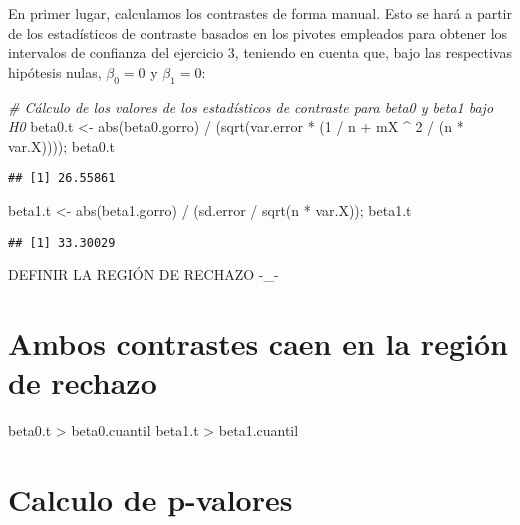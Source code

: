 \documentclass[
]{article}
\newenvironment{Shaded}{\begin{snugshade}}{\end{snugshade}}
\newcommand{\CommentTok}[1]{\textcolor[rgb]{0.56,0.35,0.01}{\textit{#1}}}
\newcommand{\DecValTok}[1]{\textcolor[rgb]{0.00,0.00,0.81}{#1}}
\newcommand{\FunctionTok}[1]{\textcolor[rgb]{0.00,0.00,0.00}{#1}}
\newcommand{\NormalTok}[1]{#1}
\newcommand{\OtherTok}[1]{\textcolor[rgb]{0.56,0.35,0.01}{#1}}
\newcommand{\SpecialCharTok}[1]{\textcolor[rgb]{0.00,0.00,0.00}{#1}}
\begin{document}
En primer lugar, calculamos los contrastes de forma manual. Esto se hará
a partir de los estadísticos de contraste basados en los pivotes
empleados para obtener los intervalos de confianza del ejercicio 3,
teniendo en cuenta que, bajo las respectivas hipótesis nulas,
\(\beta_0 = 0\) y \(\beta_1 = 0\):

\begin{Shaded}
\begin{Highlighting}[]
\CommentTok{\# Cálculo de los valores de los estadísticos de contraste para beta0 y beta1 bajo H0}
\NormalTok{beta0.t }\OtherTok{\textless{}{-}} \FunctionTok{abs}\NormalTok{(beta0.gorro) }\SpecialCharTok{/}\NormalTok{ (}\FunctionTok{sqrt}\NormalTok{(var.error }\SpecialCharTok{*}\NormalTok{ (}\DecValTok{1} \SpecialCharTok{/}\NormalTok{ n }\SpecialCharTok{+}\NormalTok{ mX }\SpecialCharTok{\^{}} \DecValTok{2} \SpecialCharTok{/}\NormalTok{ (n }\SpecialCharTok{*}\NormalTok{ var.X)))); beta0.t}
\end{Highlighting}
\end{Shaded}

\begin{verbatim}
## [1] 26.55861
\end{verbatim}

\begin{Shaded}
\begin{Highlighting}[]
\NormalTok{beta1.t }\OtherTok{\textless{}{-}} \FunctionTok{abs}\NormalTok{(beta1.gorro) }\SpecialCharTok{/}\NormalTok{ (sd.error }\SpecialCharTok{/} \FunctionTok{sqrt}\NormalTok{(n }\SpecialCharTok{*}\NormalTok{ var.X)); beta1.t}
\end{Highlighting}
\end{Shaded}

\begin{verbatim}
## [1] 33.30029
\end{verbatim}

DEFINIR LA REGIÓN DE RECHAZO -\_-

\hypertarget{ambos-contrastes-caen-en-la-regiuxf3n-de-rechazo}{%
\section{Ambos contrastes caen en la región de
rechazo}\label{ambos-contrastes-caen-en-la-regiuxf3n-de-rechazo}}

beta0.t \textgreater{} beta0.cuantil beta1.t \textgreater{}
beta1.cuantil

\hypertarget{calculo-de-p-valores}{%
\section{Calculo de p-valores}\label{calculo-de-p-valores}}
\end{document}
